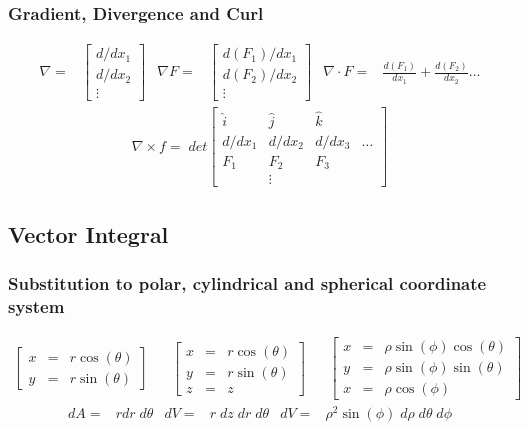 \documentclass{article}
\begin{document}
        \subsubsection{Gradient, Divergence and Curl}
            \begin{align*}
                \nabla =& \left[\begin{array}{c}d/dx_1\\[6pt]d/dx_2\\[6pt]\vdots\end{array}\right] &
                \nabla{F} =& \left[\begin{array}{c}d(F_1)/dx_1\\[6pt]d(F_2)/dx_2\\[6pt]\vdots\end{array}\right] &
                \nabla \cdot F =& \frac{d(F_1)}{dx_1} + \frac{d(F_2)}{dx_2}\dots
            \end{align*}
            \begin{align*}
                &\nabla \times f =\;det\left[\begin{array}{cccc}
                \hat{i}&\hat{j}&\hat{k}&\\[6pt]
                d/dx_1 & d/dx_2 & d/dx_3&\dots\\[6pt]
                F_1 & F_2 & F_3&\\[6pt]
                &\vdots&&
                \end{array}\right]&
            \end{align*}
    \subsection{Vector Integral}
        \subsubsection{Substitution to polar, cylindrical and spherical coordinate system}
            \begin{align*}
                \left[\begin{array}{ccc}x & = & r\cos(\theta)\\[6pt]y & = & r\sin(\theta)\end{array}\right]&&
                \left[\begin{array}{ccc}x & = & r\cos(\theta)\\[6pt]y & = & r\sin(\theta)\\[6pt]z & = & z\end{array}\right]&&
                \left[\begin{array}{ccc}x & = & \rho\sin(\phi)\cos(\theta)\\[6pt]y & = & \rho\sin(\phi)\sin(\theta)\\[6pt]x & = & \rho\cos(\phi)\end{array}\right]
            \end{align*}
            \begin{align*}
                dA =& rdr\;d\theta & dV =& r\;dz\;dr\;d\theta & dV =& \rho^2 \sin(\phi)\;d\rho\;d\theta\;d\phi
            \end{align*}
\end{document}
